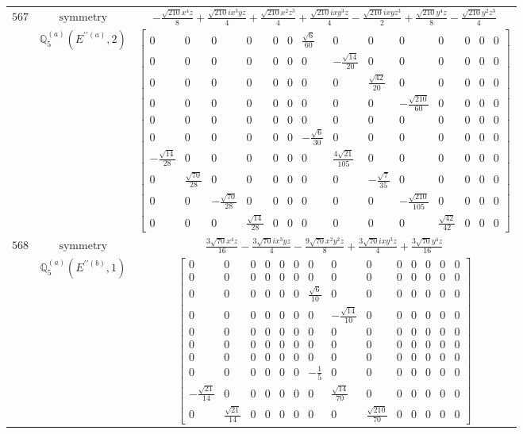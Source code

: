 \documentclass[fleqn,8pt,landscape]{jsarticle}
\begin{document}
\begin{longtable}{ccc}
$ 567 $ & $ \text{symmetry} $ & $ - \frac{\sqrt{210} x^{4} z}{8} + \frac{\sqrt{210} i x^{3} y z}{4} + \frac{\sqrt{210} x^{2} z^{3}}{4} + \frac{\sqrt{210} i x y^{3} z}{4} - \frac{\sqrt{210} i x y z^{3}}{2} + \frac{\sqrt{210} y^{4} z}{8} - \frac{\sqrt{210} y^{2} z^{3}}{4} $ \\
$  $ & $ \mathbb{Q}_{5}^{(a)}(E^{\prime\prime(a)},2) $ & $ \begin{bmatrix} 0 & 0 & 0 & 0 & 0 & 0 & \frac{\sqrt{6}}{60} & 0 & 0 & 0 & 0 & 0 & 0 & 0 \\ 0 & 0 & 0 & 0 & 0 & 0 & 0 & - \frac{\sqrt{14}}{20} & 0 & 0 & 0 & 0 & 0 & 0 \\ 0 & 0 & 0 & 0 & 0 & 0 & 0 & 0 & \frac{\sqrt{42}}{20} & 0 & 0 & 0 & 0 & 0 \\ 0 & 0 & 0 & 0 & 0 & 0 & 0 & 0 & 0 & - \frac{\sqrt{210}}{60} & 0 & 0 & 0 & 0 \\ 0 & 0 & 0 & 0 & 0 & 0 & 0 & 0 & 0 & 0 & 0 & 0 & 0 & 0 \\ 0 & 0 & 0 & 0 & 0 & 0 & - \frac{\sqrt{6}}{30} & 0 & 0 & 0 & 0 & 0 & 0 & 0 \\ - \frac{\sqrt{14}}{28} & 0 & 0 & 0 & 0 & 0 & 0 & \frac{4 \sqrt{21}}{105} & 0 & 0 & 0 & 0 & 0 & 0 \\ 0 & \frac{\sqrt{70}}{28} & 0 & 0 & 0 & 0 & 0 & 0 & - \frac{\sqrt{7}}{35} & 0 & 0 & 0 & 0 & 0 \\ 0 & 0 & - \frac{\sqrt{70}}{28} & 0 & 0 & 0 & 0 & 0 & 0 & - \frac{\sqrt{210}}{105} & 0 & 0 & 0 & 0 \\ 0 & 0 & 0 & \frac{\sqrt{14}}{28} & 0 & 0 & 0 & 0 & 0 & 0 & \frac{\sqrt{42}}{42} & 0 & 0 & 0 \end{bmatrix} $ \\ \hline
$ 568 $ & $ \text{symmetry} $ & $ \frac{3 \sqrt{70} x^{4} z}{16} - \frac{3 \sqrt{70} i x^{3} y z}{4} - \frac{9 \sqrt{70} x^{2} y^{2} z}{8} + \frac{3 \sqrt{70} i x y^{3} z}{4} + \frac{3 \sqrt{70} y^{4} z}{16} $ \\
$  $ & $ \mathbb{Q}_{5}^{(a)}(E^{\prime\prime(b)},1) $ & $ \begin{bmatrix} 0 & 0 & 0 & 0 & 0 & 0 & 0 & 0 & 0 & 0 & 0 & 0 & 0 & 0 \\ 0 & 0 & 0 & 0 & 0 & 0 & 0 & 0 & 0 & 0 & 0 & 0 & 0 & 0 \\ 0 & 0 & 0 & 0 & 0 & 0 & \frac{\sqrt{6}}{10} & 0 & 0 & 0 & 0 & 0 & 0 & 0 \\ 0 & 0 & 0 & 0 & 0 & 0 & 0 & - \frac{\sqrt{14}}{10} & 0 & 0 & 0 & 0 & 0 & 0 \\ 0 & 0 & 0 & 0 & 0 & 0 & 0 & 0 & 0 & 0 & 0 & 0 & 0 & 0 \\ 0 & 0 & 0 & 0 & 0 & 0 & 0 & 0 & 0 & 0 & 0 & 0 & 0 & 0 \\ 0 & 0 & 0 & 0 & 0 & 0 & 0 & 0 & 0 & 0 & 0 & 0 & 0 & 0 \\ 0 & 0 & 0 & 0 & 0 & 0 & - \frac{1}{5} & 0 & 0 & 0 & 0 & 0 & 0 & 0 \\ - \frac{\sqrt{21}}{14} & 0 & 0 & 0 & 0 & 0 & 0 & \frac{\sqrt{14}}{70} & 0 & 0 & 0 & 0 & 0 & 0 \\ 0 & \frac{\sqrt{21}}{14} & 0 & 0 & 0 & 0 & 0 & 0 & \frac{\sqrt{210}}{70} & 0 & 0 & 0 & 0 & 0 \end{bmatrix} $ \\ \hline

\end{longtable}
\end{document}
